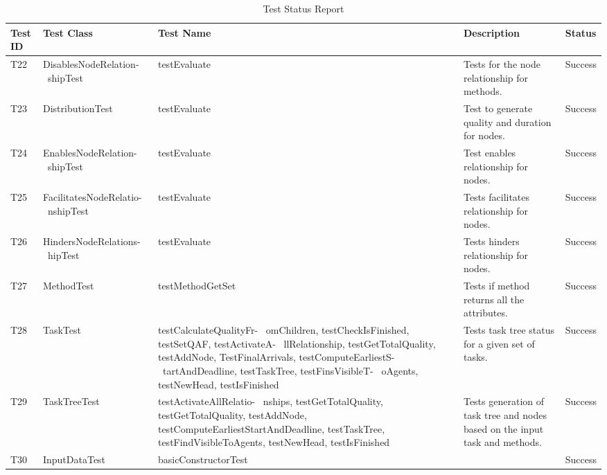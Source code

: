 \begin{enumerate}
\begin{itemize}
\begin{table}[H] 
\caption{Test Status Report} %
\begin{tabular}{| l | p{4cm} | p{4cm} | p{4cm} | l |} %
\hline\hline %
 Test ID & Test Class &Test Name &  Description & Status \\ [0.5ex] %
\hline %
T22 & DisablesNodeRelation- \ shipTest & testEvaluate &  Tests for the node relationship for methods. &  Success \\
T23 & DistributionTest & testEvaluate & Test to generate quality and duration for nodes.  &  Success \\
T24 & EnablesNodeRelation- \ shipTest &  testEvaluate & Test enables relationship for nodes. &  Success \\
T25 & FacilitatesNodeRelatio- \ nshipTest & testEvaluate & Tests facilitates relationship for nodes. &  Success \\
T26 & HindersNodeRelations- \ hipTest & testEvaluate & Tests hinders relationship for nodes. &  Success \\
T27 & MethodTest & testMethodGetSet & Tests if method returns all the attributes. &  Success \\
T28 & TaskTest & testCalculateQualityFr- \ omChildren, testCheckIsFinished, testSetQAF, testActivateA- \ llRelationship, testGetTotalQuality, testAddNode, TestFinalArrivals, testComputeEarliestS- \ tartAndDeadline, testTaskTree, testFinsVisibleT- \ oAgents, testNewHead, testIsFinished & Tests task tree status for a given set of tasks. &  Success \\
T29 & TaskTreeTest &  testActivateAllRelatio- \ nships, testGetTotalQuality, testGetTotalQuality, testAddNode, testComputeEarliestStartAndDeadline, testTaskTree, testFindVisibleToAgents, testNewHead, testIsFinished & Tests generation of task tree and nodes based on the input task and methods.  &  Success \\ 
T30 & InputDataTest & basicConstructorTest &  & Success \\
\hline %
\end{tabular} 
\label{table:nonlin} %
\end{table}


\end{itemize}
\end{enumerate}
